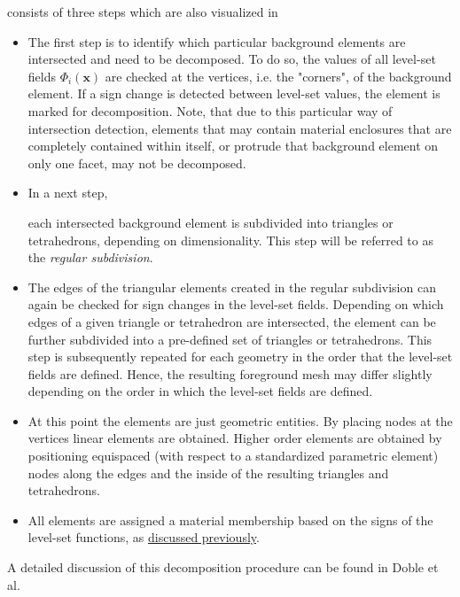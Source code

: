  consists of three steps which are also visualized in 
\begin{itemize}
    \item The first step is to identify which particular background elements are intersected and need to be decomposed. To do so, the values of all level-set fields $\Phi_i(\bm{x})$ are checked at the vertices, i.e. the "corners", of the background element. If a sign change is detected between level-set values, the element is marked for decomposition. Note, that due to this particular way of intersection detection, elements that may contain material enclosures that are completely contained within itself, or protrude that background element on only one facet, may not be decomposed.

    \item \hypertarget{regular_subdivision}{In a next step,} each intersected background element is subdivided into triangles or tetrahedrons, depending on dimensionality. This step will be referred to as the \emph{regular subdivision}.

    \item The edges of the triangular elements created in the regular subdivision can again be checked for sign changes in the level-set fields. Depending on which edges of a given triangle or tetrahedron are intersected, the element can be further subdivided into a pre-defined set of triangles or tetrahedrons.
    This step is subsequently repeated for each geometry in the order that the level-set fields are defined. Hence, the resulting foreground mesh may differ slightly depending on the order in which the level-set fields are defined.
    
    \item At this point the elements are just geometric entities. By placing nodes at the vertices linear elements are obtained. Higher order elements are obtained by positioning equispaced (with respect to a standardized parametric element) nodes along the edges and the inside of the resulting triangles and tetrahedrons.
    
    \item All elements are assigned a material membership based on the signs of the level-set functions, as \hyperlink{phase_assignment}{discussed previously}.
\end{itemize}

A detailed discussion of this decomposition procedure can be found in Doble et al. \cite{Doble2023} 

